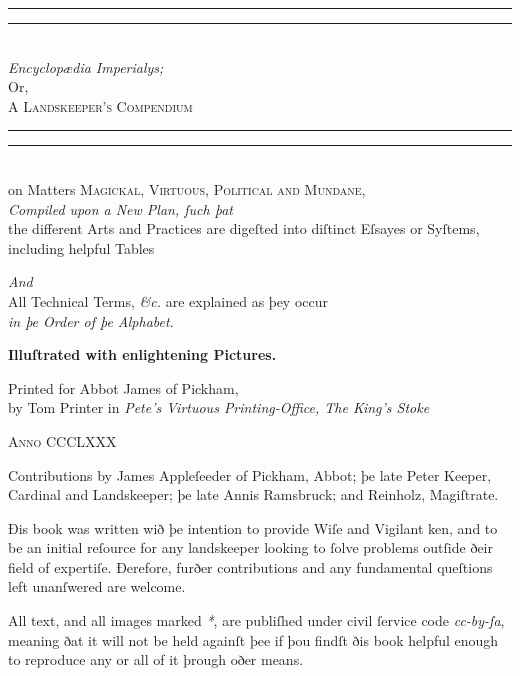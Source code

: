 \documentclass[twoside,11pt,b5paper,twocolumn]{scrbook}
\begin{document}
\begin{titlepage}
 \centering
 \vspace*{\baselineskip}
 \rule{\textwidth}{1.6pt}\vspace*{-\baselineskip}\vspace*{2pt}
 \rule{\textwidth}{0.4pt}\\[\baselineskip]
 
 {\Huge \itshape Encyclopædia Imperialys;}\\[0.4em]
 {\Large Or,\\[0.4em]}
 {\huge\scshape A Landskeeper's Compendium}\\
 \rule{\textwidth}{0.4pt}\vspace*{-\baselineskip}\vspace{3.2pt}
 \rule{\textwidth}{1.6pt}\\[\baselineskip]
 {\Large on Matters \scshape Magickal, Virtuous, Political {\normalfont and} Mundane,\\[1em]}
 {\itshape Compiled upon a New Plan, ſuch þat\\[0.5em]}
 {\large the different Arts and Practices are digeſted into diſtinct Eſsayes or Syſtems, including helpful Tables}
 
 {\itshape And\\[0.5em]}
 {\large All Technical Terms, \textit{\&c.} are explained as þey occur \\[0.5em] \itshape in þe Order of þe Alphabet.}

 \vspace{0.8cm}
 {\bfseries Illuſtrated with enlightening Pictures.}
 
 \vfill
 
 Printed for Abbot James of Pickham,\\[0.4em]
 by Tom Printer in {\itshape Pete’s Virtuous Printing-Office, The King’s Stoke}
 
 {\scshape Anno CCCLXXX}
\end{titlepage}
\begin{uppertitleback}{}
Contributions by James Appleſeeder of Pickham, Abbot; þe late Peter Keeper, Cardinal and Landskeeper; þe late Annis Ramsbruck; and Reinholz, Magiſtrate.

Ðis book was written wið þe intention to provide Wiſe and Vigilant ken, and to be an initial reſource for any landskeeper looking to ſolve problems outſide ðeir field of expertiſe. Ðerefore, furðer contributions and any fundamental queſtions left unanſwered are welcome.

All text, and all images marked \textit{*}, are publiſhed under civil ſervice code \textit{cc-by-ſa}, meaning ðat it will not be held againſt þee if þou findſt ðis book helpful enough to reproduce any or all of it þrough oðer means. 
\end{uppertitleback}
\setlength{\parindent}{1em}
\end{document}
